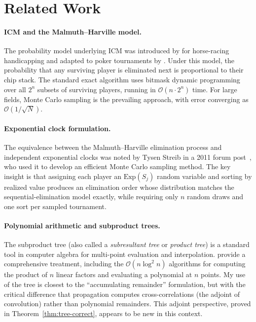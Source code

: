 \documentclass[11pt]{article}
\newcommand{\bigO}{\mathcal{O}}
\begin{document}
\section{Related Work}\label{sec:related}

\paragraph{ICM and the Malmuth--Harville model.}
The probability model underlying ICM was introduced by
\citet{harville1973} for horse-racing handicapping and adapted to poker
tournaments by \citet{malmuth1987}. Under this model, the probability
that any surviving player is eliminated next is proportional to their
chip stack. The standard exact algorithm uses bitmask dynamic programming
over all $2^n$ subsets of surviving players, running in
$\bigO(n \cdot 2^n)$ time. For large fields, Monte Carlo sampling is the
prevailing approach, with error converging as $\bigO(1/\sqrt{N})$.

\paragraph{Exponential clock formulation.}
The equivalence between the Malmuth--Harville elimination process and
independent exponential clocks was noted by Tysen Streib in a 2011
forum post~\citep{streib2011}, who used it to develop an efficient Monte
Carlo sampling method. The key insight is that assigning each player an
$\mathrm{Exp}(S_j)$ random variable and sorting by realized value
produces an elimination order whose distribution matches the
sequential-elimination model exactly, while requiring only $n$ random
draws and one sort per sampled tournament.

\paragraph{Polynomial arithmetic and subproduct trees.}
The subproduct tree (also called a \emph{subresultant tree} or
\emph{product tree}) is a standard tool in computer algebra for
multi-point evaluation and interpolation.
\citet{vonzurgathen2013} provide a comprehensive treatment, including the
$\bigO(n \log^2 n)$ algorithms for computing the product of $n$ linear
factors and evaluating a polynomial at $n$ points. My use of the tree is
closest to the ``accumulating remainder'' formulation, but with the
critical difference that propagation computes cross-correlations (the
adjoint of convolution) rather than polynomial remainders. This adjoint
perspective, proved in Theorem~\ref{thm:tree-correct}, appears to be new
in this context.
\end{document}
